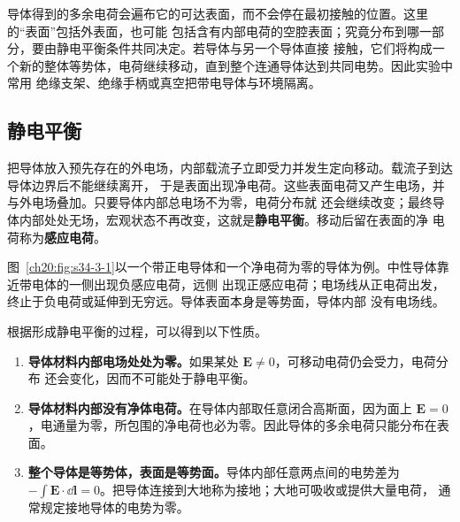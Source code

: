 {导体得到的多余电荷会遍布它的可达表面，而不会停在最初接触的位置。这里的“表面”包括外表面，也可能
包括含有内部电荷的空腔表面；究竟分布到哪一部分，要由静电平衡条件共同决定。若导体与另一个导体直接
接触，它们将构成一个新的整体等势体，电荷继续移动，直到整个连通导体达到共同电势。因此实验中常用
绝缘支架、绝缘手柄或真空把带电导体与环境隔离。


\subsection{静电平衡}


把导体放入预先存在的外电场，内部载流子立即受力并发生定向移动。载流子到达导体边界后不能继续离开，
于是表面出现净电荷。这些表面电荷又产生电场，并与外电场叠加。只要导体内部总电场不为零，电荷分布就
还会继续改变；最终导体内部处处无场，宏观状态不再改变，这就是\textbf{静电平衡}。移动后留在表面的净
电荷称为\textbf{感应电荷}。

图~\ref{ch20:fig:s34-3-1}以一个带正电导体和一个净电荷为零的导体为例。中性导体靠近带电体的一侧出现负感应电荷，远侧
出现正感应电荷；电场线从正电荷出发，终止于负电荷或延伸到无穷远。导体表面本身是等势面，导体内部
没有电场线。

\par\noindent\begin{minipage}{\linewidth}
\conductorFieldFigure
{}\label{ch20:fig:s34-3-1}
\end{minipage}\par\medskip

根据形成静电平衡的过程，可以得到以下性质。

\begin{enumerate}[label=\arabic*.]
  \item \textbf{导体材料内部电场处处为零。}如果某处 $\boldsymbol E\ne0$，可移动电荷仍会受力，电荷分布
  还会变化，因而不可能处于静电平衡。

  \item \textbf{导体材料内部没有净体电荷。}在导体内部取任意闭合高斯面，因为面上
  $\boldsymbol E=0$，电通量为零，所包围的净电荷也必为零。因此导体的多余电荷只能分布在表面。

  \item \textbf{整个导体是等势体，表面是等势面。}导体内部任意两点间的电势差为
  $-\int\boldsymbol E\cdot\dd\boldsymbol l=0$。把导体连接到大地称为接地；大地可吸收或提供大量电荷，
  通常规定接地导体的电势为零。


\end{enumerate}}
